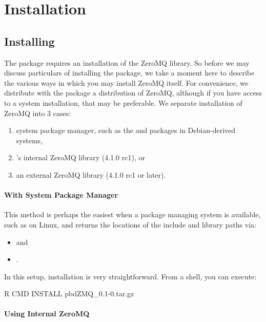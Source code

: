 \section[Installation]{Installation}
\label{sec:installation}


\subsection{Installing}

The  package requires an installation of the ZeroMQ library.  So 
before we may discuss particulars of installing the  package, we 
take a moment here to describe the various ways in which you may install ZeroMQ 
itself.  For convenience, we distribute with the package a distribution of 
ZeroMQ, although if you have access to a system installation, that may be 
preferable.  We separate installation of ZeroMQ into 3 cases:
\begin{enumerate}
  \item system package manager, such as the  and 
   packages in Debian-derived systems,
  \item {}'s internal ZeroMQ library (4.1.0 rc1), or
  \item an external ZeroMQ library (4.1.0 rc1 or later).
\end{enumerate}


\paragraph{With System Package Manager}

This method is perhaps the easiest when a package managing system is available, 
such as on Linux, and returns the locations of the  include and 
library paths via:
\begin{itemize}
\item {} and
\item {}.
\end{itemize}
In this setup, installation is very straightforward.  From a shell, you can 
execute:
\begin{Command}
R CMD INSTALL pbdZMQ_0.1-0.tar.gz
\end{Command}



\paragraph{Using Internal ZeroMQ}

